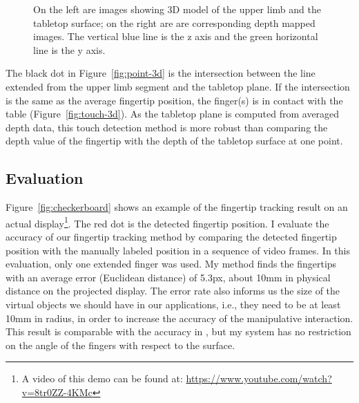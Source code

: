 \begin{figure}[tbh]
\centering
{}
\caption{On the left are images showing 3D model of the upper limb and the
tabletop surface; on the right are are corresponding
depth mapped images. The vertical blue line is the z axis and the green
horizontal line is the y axis.}
\label{fig:3d-model}
\end{figure}

The black dot in Figure~\ref{fig:point-3d} is the intersection
between the line extended from the upper limb segment and the tabletop plane. If
the intersection is the same as the average fingertip position, the finger(s) is
in contact with the table (Figure~\ref{fig:touch-3d}). As the tabletop plane is
computed from averaged depth data, this touch detection method is more robust
than comparing the depth value of the fingertip with the depth of the tabletop
surface at one point.

\subsection{Evaluation}
Figure~\ref{fig:checkerboard} shows an example of the fingertip tracking result
on an actual display\footnote{A video of this demo can be found at:
\url{https://www.youtube.com/watch?v=8tr0ZZ-4KMc}}.
The red dot is the detected fingertip position. I evaluate the accuracy of our
fingertip tracking method by comparing the detected fingertip position with the manually labeled position in a sequence of video frames. In this evaluation, only one extended finger was used. My
method finds the fingertips with an average error (Euclidean
distance) of 5.3px, about 10mm in physical distance on the
projected display. The error rate also informs us the size of the virtual objects we should have in
our applications, i.e., they need to be at least 10mm in radius, in order to
increase the accuracy of the manipulative interaction. This result is
comparable with the accuracy in \cite{harrison11}, but my system has no
restriction on the angle of the fingers with respect to the surface.

